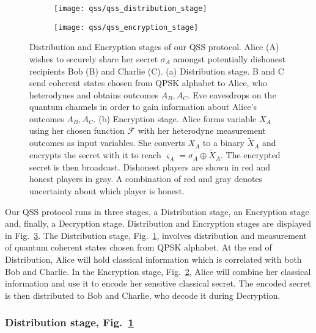 \begin{figure}[htp]
\captionsetup{width=0.8\linewidth}
\centering
	\begin{subfigure}{0.8\linewidth}
		\centering
		\label{fig:qss_distribution_stage}
		\texttt{[image: qss/qss\_distribution\_stage]}
		
	\end{subfigure}
	\begin{subfigure}{0.8\linewidth}
		\centering
		\label{fig:qss_encryption_stage}
		\texttt{[image: qss/qss\_encryption\_stage]}
		
	\end{subfigure}
\caption{\label{fig:qss_protocol_cartoon} Distribution and Encryption stages of our QSS protocol. Alice (A) wishes to securely share her secret $\sigma_A$ amongst potentially dishonest recipients Bob (B) and Charlie (C). (a) Distribution stage. B and C send coherent states chosen from QPSK alphabet to Alice, who heterodynes and obtains outcomes $A_B, A_C$. Eve eavesdrops on the quantum channels in order to gain information about Alice's outcomes $A_B, A_C$. (b) Encryption stage. Alice forms variable $X_A$ using her chosen function $\mathcal{F}$ with her heterodyne measurement outcomes as input variables. She converts $X_A$ to a binary $\tilde{X}_A$ and encrypts the secret with it to reach $\varsigma_A = \sigma_A \oplus \tilde{X}_A$. The encrypted secret is then broadcast. Dishonest players are shown in red and honest players in gray. A combination of red and gray denotes uncertainty about which player is honest.
}
\end{figure}


Our QSS protocol runs in three stages, a Distribution stage, an Encryption stage and, finally, a Decryption stage. Distribution and Encryption stages are displayed in Fig.~\ref{fig:qss_protocol_cartoon}. The Distribution stage, Fig.~\ref{fig:qss_distribution_stage}, involves distribution and measurement of quantum coherent states chosen from QPSK alphabet. At the end of Distribution, Alice will hold classical information which is correlated with both Bob and Charlie. In the Encryption stage, Fig.~\ref{fig:qss_encryption_stage}, Alice will combine her classical information and use it to encode her sensitive classical secret. The encoded secret is then distributed to Bob and Charlie, who decode it during Decryption. 


\subsubsection*{Distribution stage, Fig.~\ref{fig:qss_distribution_stage}}

